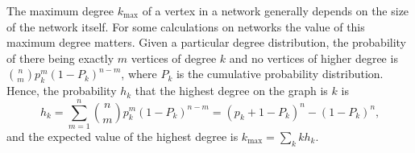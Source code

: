         The maximum degree $k_{\mbox{max}}$ of a vertex in a network generally depends on the size of the network itself. For some calculations on networks the value of this maximum degree matters. Given a particular degree distribution, the probability of there being exactly $m$ vertices of degree $k$ and no vertices of higher degree is $\binom{n}{m} p^m_k (1 − P_k)^{n−m}$, where $P_k$ is the cumulative probability distribution. Hence, the probability $h_k$ that the highest degree on the graph is $k$ is
        \begin{equation}
          h_k = \sum_{m=1}^n \binom{n}{m} p^m_k (1 - P_k)^{n-m} = (p_k + 1 - P_k)^n - (1 - P_k)^n\mbox{,}
        \end{equation}
        and the expected value of the highest degree is $k_{\mbox{max}} = \sum_k kh_k$.